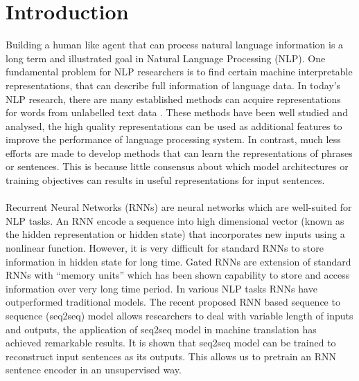 \chapter{Introduction}
\label{Introduction}
Building a human like agent that can process natural language information is a long term and illustrated goal in Natural Language Processing (NLP). 
One fundamental problem for NLP researchers is to find certain machine interpretable representations, that can describe full information of language data. 
In today's NLP research, there are many established methods can acquire representations for words from unlabelled text data \cite{mikolov2013distributed,mikolov2013efficient,pennington2014glove}.
These methods have been well studied and analysed\cite{levy2014neural}, the high quality representations can be used as additional features to improve the performance of language processing system\cite{collobert2011natural}. 
In contrast, much less efforts are made to develop methods that can learn the representations of phrases or sentences.
This is because little consensus about which model architectures or training objectives can results in useful representations for input sentences\cite{hill2016learning}.\\\\
Recurrent Neural Networks (RNNs)\cite{elman1991distributed} are neural networks which are well-suited for NLP tasks. An RNN encode a sequence into high dimensional vector (known as the hidden representation or hidden state) that incorporates new inputs using a nonlinear function\cite{sutskever2013training}. 
However, it is very difficult for standard RNNs to store information in hidden state for long time\cite{bengio1994learning}. 
 Gated RNNs\cite{hochreiter1997long,chung2014empirical} are extension of standard RNNs with ``memory units'' which has been shown capability to store and access information over very long time period. 
 In various NLP tasks RNNs have outperformed traditional models\cite{mikolov2012statistical}.
The recent proposed RNN based sequence to sequence (seq2seq) model\cite{cho2014learning,sutskever2014sequence} allows researchers to deal with variable length of inputs and outputs, the application of seq2seq model in machine translation has achieved remarkable results\cite{cho2014learning,sutskever2014sequence}.
It is shown that seq2seq model can be trained to reconstruct input sentences as its outputs\cite{dai2015semi}. 
This allows us to pretrain an RNN sentence encoder in an unsupervised way. \\\\
